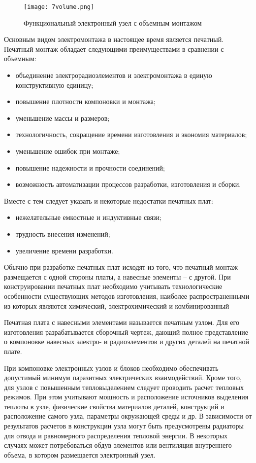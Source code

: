 \begin{figure}[h!]
	\caption{ Функциональный электронный узел с объемным монтажом }
	\texttt{[image: 7volume.png]}
	\label{pic:7volume}
\end{figure}

Основным видом электромонтажа в настоящее время является печатный. Печатный монтаж обладает следующими преимуществами в сравнении с объемным: 
\begin{itemize}
\item объединение электрорадиоэлементов и электромонтажа в единую конструктивную единицу;
\item повышение плотности компоновки и монтажа;
\item уменьшение массы и размеров;
\item технологичность, сокращение времени изготовления и экономия материалов;
\item уменьшение ошибок при монтаже;
\item повышение надежности и прочности соединений;
\item возможность автоматизации процессов разработки, изготовления и сборки.
\end{itemize}

Вместе с тем следует указать и некоторые недостатки печатных плат:
\begin{itemize}
\item нежелательные емкостные и индуктивные связи;
\item трудность внесения изменений;
\item увеличение времени разработки.
\end{itemize}

Обычно при разработке печатных плат исходят из того, что печатный монтаж размещается с одной стороны платы, а навесные элементы -- с другой.
При конструировании печатных плат необходимо учитывать технологические особенности существующих методов изготовления, наиболее распространенными из которых являются химический, электрохимический и комбинированный

Печатная плата с навесными элементами называется печатным узлом. Для его изготовления разрабатывается сборочный чертеж, дающий полное представление о компоновке навесных электро- и радиоэлементов и других деталей на печатной плате.

При компоновке электронных узлов и блоков необходимо обеспечивать допустимый минимум паразитных электрических взаимодействий. Кроме того, для узлов с повышенным тепловыделением следует проводить расчет тепловых режимов. При этом учитывают мощность и расположение источников выделения теплоты в узле, физические свойства материалов деталей, конструкций и расположение самого узла, параметры окружающей среды и др. В зависимости от результатов расчетов в конструкции узла могут быть предусмотрены радиаторы для отвода и равномерного распределения тепловой энергии. В некоторых случаях может потребоваться обдув элементов или вентиляция внутреннего объема, в котором размещается электронный узел.


